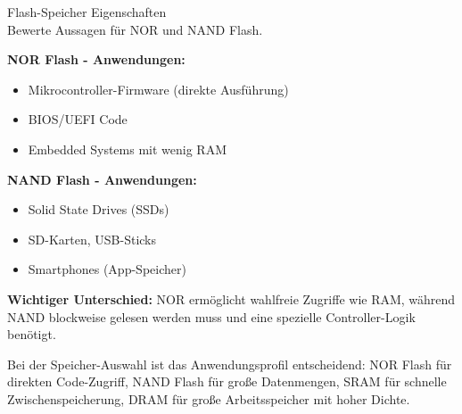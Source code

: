 \begin{example2}{Flash-Speicher Eigenschaften}\\
    Bewerte Aussagen für NOR und NAND Flash.
    
    \tcblower
    
    \textbf{NOR Flash - Anwendungen:}
    \begin{itemize}
        \item Mikrocontroller-Firmware (direkte Ausführung)
        \item BIOS/UEFI Code
        \item Embedded Systems mit wenig RAM
    \end{itemize}
    
    \textbf{NAND Flash - Anwendungen:}
    \begin{itemize}
        \item Solid State Drives (SSDs)
        \item SD-Karten, USB-Sticks
        \item Smartphones (App-Speicher)
    \end{itemize}
    
    \textbf{Wichtiger Unterschied:}
    NOR ermöglicht wahlfreie Zugriffe wie RAM, während NAND blockweise gelesen werden muss und eine spezielle Controller-Logik benötigt.
\end{example2}

\begin{remark}
    Bei der Speicher-Auswahl ist das Anwendungsprofil entscheidend: NOR Flash für direkten Code-Zugriff, NAND Flash für große Datenmengen, SRAM für schnelle Zwischenspeicherung, DRAM für große Arbeitsspeicher mit hoher Dichte.
\end{remark}